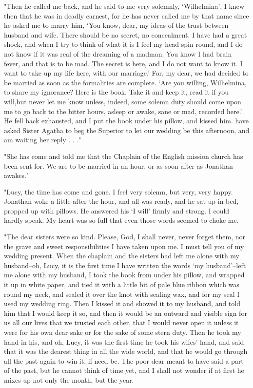 "Then he called me back, and he said to me very solemnly, `Wilhelmina', I knew then that he was in deadly earnest, for he has never called me by that name since he asked me to marry him, `You know, dear, my ideas of the trust between husband and wife. There should be no secret, no concealment. I have had a great shock, and when I try to think of what it is I feel my head spin round, and I do not know if it was real of the dreaming of a madman. You know I had brain fever, and that is to be mad. The secret is here, and I do not want to know it. I want to take up my life here, with our marriage.' For, my dear, we had decided to be married as soon as the formalities are complete. `Are you willing, Wilhelmina, to share my ignorance? Here is the book. Take it and keep it, read it if you will,but never let me know unless, indeed, some solemn duty should come upon me to go back to the bitter hours, asleep or awake, sane or mad, recorded here.' He fell back exhausted, and I put the book under his pillow, and kissed him. have asked Sister Agatha to beg the Superior to let our wedding be this afternoon, and am waiting her reply . . ." 

"She has come and told me that the Chaplain of the English mission church has been sent for. We are to be married in an hour, or as soon after as Jonathan awakes." 

"Lucy, the time has come and gone. I feel very solemn, but very, very happy. Jonathan woke a little after the hour, and all was ready, and he sat up in bed, propped up with pillows. He answered his `I will' firmly and strong. I could hardly speak. My heart was so full that even those words seemed to choke me. 

"The dear sisters were so kind. Please, God, I shall never, never forget them, nor the grave and sweet responsibilities I have taken upon me. I must tell you of my wedding present. When the chaplain and the sisters had left me alone with my husband--oh, Lucy, it is the first time I have written the words `my husband'--left me alone with my husband, I took the book from under his pillow, and wrapped it up in white paper, and tied it with a little bit of pale blue ribbon which was round my neck, and sealed it over the knot with sealing wax, and for my seal I used my wedding ring. Then I kissed it and showed it to my husband, and told him that I would keep it so, and then it would be an outward and visible sign for us all our lives that we trusted each other, that I would never open it unless it were for his own dear sake or for the sake of some stern duty. Then he took my hand in his, and oh, Lucy, it was the first time he took his wifes' hand, and said that it was the dearest thing in all the wide world, and that he would go through all the past again to win it, if need be. The poor dear meant to have said a part of the past, but he cannot think of time yet, and I shall not wonder if at first he mixes up not only the month, but the year. 

